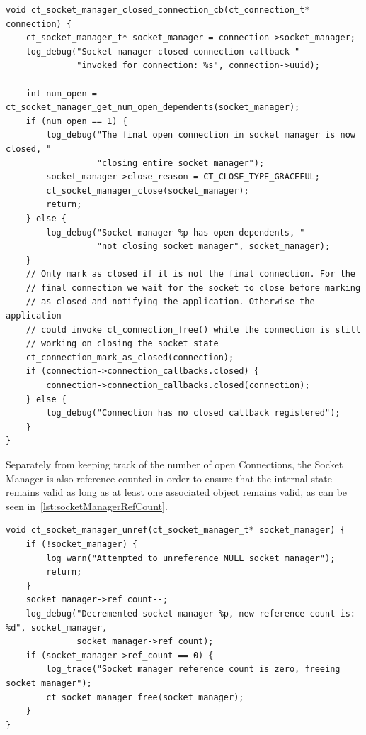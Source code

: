 \begin{listing}[htbp]
  \begin{verbatim}
void ct_socket_manager_closed_connection_cb(ct_connection_t* connection) {
    ct_socket_manager_t* socket_manager = connection->socket_manager;
    log_debug("Socket manager closed connection callback "
              "invoked for connection: %s", connection->uuid);

    int num_open = ct_socket_manager_get_num_open_dependents(socket_manager);
    if (num_open == 1) {
        log_debug("The final open connection in socket manager is now closed, "
                  "closing entire socket manager");
        socket_manager->close_reason = CT_CLOSE_TYPE_GRACEFUL;
        ct_socket_manager_close(socket_manager);
        return;
    } else {
        log_debug("Socket manager %p has open dependents, "
                  "not closing socket manager", socket_manager);
    }
    // Only mark as closed if it is not the final connection. For the
    // final connection we wait for the socket to close before marking
    // as closed and notifying the application. Otherwise the application
    // could invoke ct_connection_free() while the connection is still
    // working on closing the socket state
    ct_connection_mark_as_closed(connection);
    if (connection->connection_callbacks.closed) {
        connection->connection_callbacks.closed(connection);
    } else {
        log_debug("Connection has no closed callback registered");
    }
}
  \end{verbatim}
  \caption[Socket Manager Connection closed callback]
  {Socket Manager callback invoked by protocol interface on Connection close, showing how it only closes the underlying socket when the last Connection closes.}
  \label{lst:socket-manager-close-callback}
\end{listing}

Separately from keeping track of the number of open Connections,
the Socket Manager is also reference counted in order to ensure
that the internal state remains valid as long as at least one associated
object remains valid, as can be seen in~\cref{lst:socketManagerRefCount}.

\begin{listing}[htbp]
  \begin{verbatim}
void ct_socket_manager_unref(ct_socket_manager_t* socket_manager) {
    if (!socket_manager) {
        log_warn("Attempted to unreference NULL socket manager");
        return;
    }
    socket_manager->ref_count--;
    log_debug("Decremented socket manager %p, new reference count is: %d", socket_manager,
              socket_manager->ref_count);
    if (socket_manager->ref_count == 0) {
        log_trace("Socket manager reference count is zero, freeing socket manager");
        ct_socket_manager_free(socket_manager);
    }
}
  \end{verbatim}
  \caption[Socket Manager reference counting]{Internal Socket Manager reference counting, ensuring that the Socket Manager remains valid until all associated objects have been freed.}
  \label{lst:socketManagerRefCount}
\end{listing}


